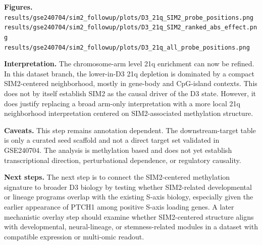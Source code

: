 \textbf{Figures.}
\texttt{results/gse240704/sim2_followup/plots/D3_21q_SIM2_probe_positions.png}\\
\texttt{results/gse240704/sim2_followup/plots/D3_21q_SIM2_ranked_abs_effect.png}\\
\texttt{results/gse240704/sim2_followup/plots/D3_21q_all_probe_positions.png}

\textbf{Interpretation.}
The chromosome-arm level 21q enrichment can now be refined. In this dataset branch, the lower-in-D3 21q depletion is dominated by a compact SIM2-centered neighborhood, mostly in gene-body and CpG-island contexts. This does not by itself establish SIM2 as the causal driver of the D3 state. However, it does justify replacing a broad arm-only interpretation with a more local 21q neighborhood interpretation centered on SIM2-associated methylation structure.

\textbf{Caveats.}
This step remains annotation dependent. The downstream-target table is only a curated seed scaffold and not a direct target set validated in GSE240704. The analysis is methylation based and does not yet establish transcriptional direction, perturbational dependence, or regulatory causality.

\textbf{Next steps.}
The next step is to connect the SIM2-centered methylation signature to broader D3 biology by testing whether SIM2-related developmental or lineage programs overlap with the existing S-axis biology, especially given the earlier appearance of PTCH1 among positive S-axis loading genes. A later mechanistic overlay step should examine whether SIM2-centered structure aligns with developmental, neural-lineage, or stemness-related modules in a dataset with compatible expression or multi-omic readout.
